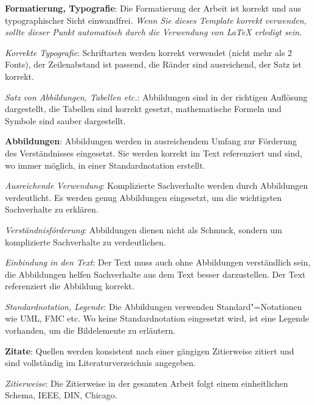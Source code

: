 \begin{checklist}
\begin{checklist}
    \end{checklist}
  \item \textbf{Formatierung, Typografie}: Die Formatierung der Arbeit ist korrekt und aus typographischer Sicht einwandfrei. \textit{Wenn Sie dieses Template korrekt verwenden, sollte dieser Punkt automatisch durch die Verwendung von \LaTeX{} erledigt sein.}
    \begin{checklist}
        \item \textit{Korrekte Typografie}: Schriftarten werden korrekt verwendet (nicht mehr als 2 Fonts), der Zeilenabstand ist passend, die Ränder sind ausreichend, der Satz ist korrekt.
        \item \textit{Satz von Abbildungen, Tabellen etc.}: Abbildungen sind in der richtigen Auflösung dargestellt, die Tabellen sind korrekt gesetzt, mathematische Formeln und Symbole sind sauber dargestellt.
    \end{checklist}
  \item \textbf{Abbildungen}: Abbildungen werden in ausreichendem Umfang zur Förderung des Verständnisses eingesetzt. Sie werden korrekt im Text referenziert und sind, wo immer möglich, in einer Standardnotation erstellt.
    \begin{checklist}
        \item \textit{Ausreichende Verwendung}: Komplizierte Sachverhalte werden durch Abbildungen verdeutlicht. Es werden genug Abbildungen eingesetzt, um die wichtigsten Sachverhalte zu erklären.
        \item \textit{Verständnisförderung}: Abbildungen dienen nicht als Schmuck, sondern um komplizierte Sachverhalte zu verdeutlichen.
        \item \textit{Einbindung in den Text}: Der Text muss auch ohne Abbildungen verständlich sein, die Abbildungen helfen Sachverhalte aus dem Text besser darzustellen. Der Text referenziert die Abbildung korrekt.
        \item \textit{Standardnotation, Legende}: Die Abbildungen verwenden Standard"=Notationen wie UML, FMC etc. Wo keine Standardnotation eingesetzt wird, ist eine Legende vorhanden, um die Bildelemente zu erläutern.
    \end{checklist}
  \item \textbf{Zitate}: Quellen werden konsistent nach einer gängigen Zitierweise zitiert und sind vollständig im Literaturverzeichnis angegeben.
    \begin{checklist}
        \item \textit{Zitierweise}: Die Zitierweise in der gesamten Arbeit folgt einem einheitlichen Schema, \zb{} IEEE, DIN, Chicago.

\end{checklist}
\end{checklist}
